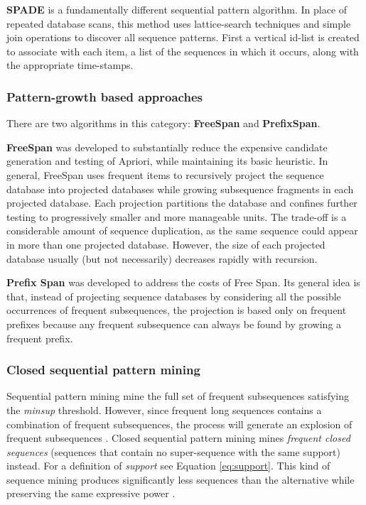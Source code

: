 \textbf{SPADE} is a fundamentally different sequential pattern algorithm. In place of repeated database scans, this method uses lattice-search techniques and simple join operations to discover all sequence patterns. First a vertical id-list is created to associate with each item, a list of the sequences in which it occurs, along with the appropriate time-stamps. 

\subsubsection*{Pattern-growth based approaches} 

There are two algorithms in this category: \textbf{FreeSpan} and \textbf{PrefixSpan}.

\textbf{FreeSpan} was developed to substantially reduce the expensive candidate generation and testing of Apriori, while maintaining its basic heuristic. In general, FreeSpan uses frequent items to recursively project the sequence database into projected databases while growing subsequence fragments in each projected database. Each projection partitions the database and confines further testing to progressively smaller and more manageable units. The trade-off is a considerable amount of sequence duplication, as the same sequence could appear in more than one projected database. However, the size of each projected database usually (but not necessarily) decreases rapidly with recursion. 

\textbf{Prefix Span} was developed to address the costs of Free Span. Its general idea is that, instead of projecting sequence databases by considering all the possible occurrences of frequent subsequences, the projection is based only on frequent prefixes because any frequent subsequence can always be found by growing a frequent prefix. 

\subsubsection*{Closed sequential pattern mining}
Sequential pattern mining mine the full set of frequent subsequences satisfying the \textit{minsup} threshold. However, since frequent long sequences contains a combination of frequent subsequences, the process will generate an explosion of frequent subsequences \cite{yan2003clospan}. Closed sequential pattern mining mines \textit{frequent closed sequences} (sequences that contain no super-sequence with the same support) instead. For a definition of \textit{support} see Equation \ref{eq:support}. This kind of sequence mining produces significantly less sequences than the alternative while preserving the same expressive power \cite{yan2003clospan}.

